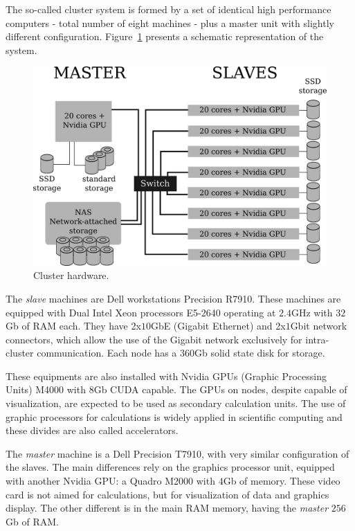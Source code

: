 \documentclass[twoside,a4paper,12pt,english]{inac19}
\begin{document}
The so-called cluster system is formed by a set of identical high performance computers -
total number of eight machines - plus a master unit with slightly different configuration.
Figure~\ref{fig:cluster} presents a schematic representation of the system.

\begin{figure}[h] %
  \centering\includegraphics[scale=0.7]{images/cluster-topologico.png}
  \caption{Cluster hardware.}
  \label{fig:cluster}
\end{figure}

The \textit{slave} machines are Dell workstations Precision R7910. These machines are equipped
with Dual Intel{\textregistered} Xeon{\textregistered} processors E5-2640 operating at $2.4$GHz with
$32$Gb of RAM each. They have 2x$10$GbE (Gigabit Ethernet) and 2x$1$Gbit network connectors, which
allow the use of the Gigabit network exclusively for intra-cluster communication. Each node
has a $360$Gb solid state disk for storage.

These equipments are also installed with Nvidia{\textregistered} GPUs (Graphic Processing Units) M4000{\textregistered} with $8$Gb CUDA\cite{CUDA} capable.
The GPUs on nodes, despite capable of visualization, are expected to be used as secondary calculation units.
The use of graphic processors for calculations is widely applied in scientific computing and these divides
are also called accelerators\cite{accelerators}.

The \textit{master} machine is a Dell Precision T7910, with very similar configuration of the slaves. The main
differences rely on the graphics processor unit, equipped with another Nvidia{\textregistered} GPU: a
Quadro{\textregistered} M2000 with $4$Gb of memory. These video card is not aimed for calculations, but for
visualization of data and graphics display. The other different is in the main RAM memory, having the \textit{master}
$256$Gb of RAM. 
\end{document}
